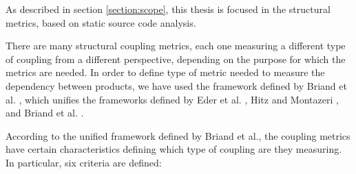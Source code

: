As described in section \ref{section:scope}, this thesis is focused in the structural metrics, based on static source code analysis.

There are many structural coupling metrics, each one measuring a different type of coupling from a different perspective, depending on the purpose for which the metrics are needed. In order to define type of metric needed to measure the dependency between products, we have used the framework defined by Briand et al. \cite{briand1999unified}, which unifies the frameworks defined by Eder et al. \cite{eder1994coupling}, Hitz and Montazeri \cite{hitz1995measuring}, and Briand et al. \cite{briand1997investigation}.

According to the unified framework defined by Briand et al., the coupling metrics have certain characteristics defining which type of coupling are they measuring. In particular, six criteria are defined:

